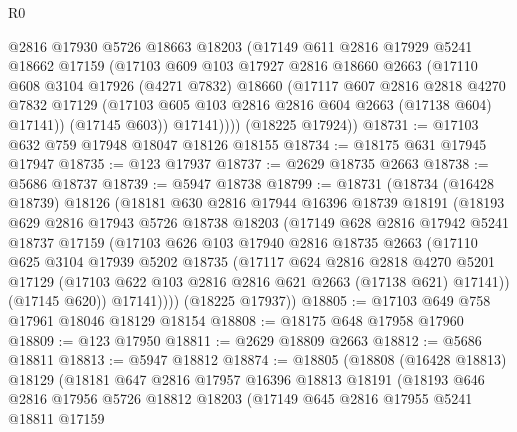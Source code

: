 \begin{lexlean}{R0}
\begin{coremodule}
          @2816
          @17930
          @5726
          @18663
          @18203
          (@17149
            @611
            @2816
            @17929
            @5241
            @18662
            @17159
            (@17103
              @609
              @103
              @17927
              @2816
              @18660
              @2663
              (@17110
                @608
                @3104
                @17926
                (@4271 @7832)
                @18660
                (@17117
                  @607
                  @2816
                  @2818
                  @4270
                  @7832
                  @17129
                  (@17103 @605 @103 @2816 @2816 @604 @2663 (@17138 @604) @17141))
                (@17145 @603))
              @17141))))
      (@18225 @17924))
@18731 := @17103 @632 @759 @17948 @18047 @18126 @18155
@18734 := @18175 @631 @17945 @17947
@18735 := @123 @17937
@18737 := @2629 @18735 @2663
@18738 := @5686 @18737
@18739 := @5947 @18738
@18799 := @18731
    (@18734
      (@16428 @18739)
      @18126
      (@18181
        @630
        @2816
        @17944
        @16396
        @18739
        @18191
        (@18193
          @629
          @2816
          @17943
          @5726
          @18738
          @18203
          (@17149
            @628
            @2816
            @17942
            @5241
            @18737
            @17159
            (@17103
              @626
              @103
              @17940
              @2816
              @18735
              @2663
              (@17110
                @625
                @3104
                @17939
                @5202
                @18735
                (@17117
                  @624
                  @2816
                  @2818
                  @4270
                  @5201
                  @17129
                  (@17103 @622 @103 @2816 @2816 @621 @2663 (@17138 @621) @17141))
                (@17145 @620))
              @17141))))
      (@18225 @17937))
@18805 := @17103 @649 @758 @17961 @18046 @18129 @18154
@18808 := @18175 @648 @17958 @17960
@18809 := @123 @17950
@18811 := @2629 @18809 @2663
@18812 := @5686 @18811
@18813 := @5947 @18812
@18874 := @18805
    (@18808
      (@16428 @18813)
      @18129
      (@18181
        @647
        @2816
        @17957
        @16396
        @18813
        @18191
        (@18193
          @646
          @2816
          @17956
          @5726
          @18812
          @18203
          (@17149
            @645
            @2816
            @17955
            @5241
            @18811
            @17159

\end{coremodule}
\end{lexlean}
